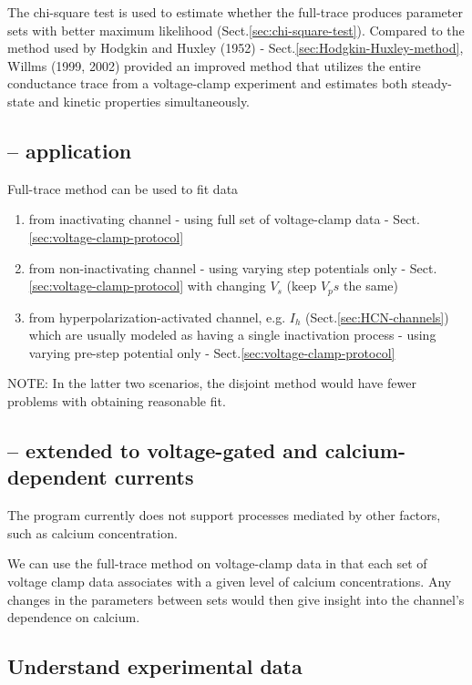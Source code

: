 The chi-square test is used to estimate whether the full-trace produces
parameter sets with better maximum likelihood (Sect.\ref{sec:chi-square-test}).
Compared to the method used by Hodgkin and Huxley (1952) -
Sect.\ref{sec:Hodgkin-Huxley-method}, Willms (1999, 2002) provided an improved
method that utilizes the entire conductance trace from a voltage-clamp
experiment and estimates both steady-state and kinetic properties
simultaneously.

\subsection{-- application}


Full-trace method can be used to fit data
\begin{enumerate}
  \item from inactivating channel - using full set of voltage-clamp data -
  Sect.\ref{sec:voltage-clamp-protocol}

  \item from non-inactivating channel - using varying step potentials only -
  Sect.\ref{sec:voltage-clamp-protocol} with changing $V_s$ (keep $V_ps$ the
  same)

  \item from hyperpolarization-activated channel, e.g. $I_h$
  (Sect.\ref{sec:HCN-channels}) which are usually modeled as having a single
  inactivation process - using varying pre-step potential only -
  Sect.\ref{sec:voltage-clamp-protocol}

\end{enumerate}
NOTE: In the latter two scenarios, the disjoint method would have fewer problems
with obtaining reasonable fit.

\subsection{-- extended to voltage-gated and calcium-dependent currents}

The program currently does not support processes mediated by other factors, such
as calcium concentration.

We can use the full-trace method on voltage-clamp data in that each set of
voltage clamp data associates with a given level of calcium concentrations.
Any changes in the parameters between sets would then give insight into the
channel's dependence on calcium.





\subsection{Understand experimental data}

